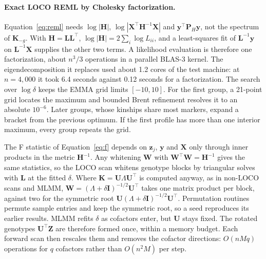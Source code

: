 \documentclass[11pt]{article}
\newcommand{\y}{\mathbf{y}}
\newcommand{\z}{\mathbf{z}}
\newcommand{\K}{\mathbf{K}}
\newcommand{\X}{\mathbf{X}}
\newcommand{\U}{\mathbf{U}}
\newcommand{\I}{\mathbf{I}}
\newcommand{\Hm}{\mathbf{H}}
\newcommand{\Pm}{\mathbf{P}}
\begin{document}
\paragraph{Exact LOCO REML by Cholesky factorization.}
Equation~\eqref{eq:reml} needs $\log|\Hm|$, $\log|\X^\top\Hm^{-1}\X|$
and $\y^\top\Pm_H\y$, not the spectrum of $\K_{-g}$. With
$\Hm=\mathbf L\mathbf L^\top$, $\log|\Hm|=2\sum_i\log L_{ii}$, and a
least-squares fit of $\mathbf L^{-1}\y$ on $\mathbf L^{-1}\X$ supplies
the other two terms. A likelihood evaluation is therefore one
factorization, about $n^3/3$ operations in a parallel BLAS-3 kernel.
The eigendecomposition it replaces used about 1.2 cores of the test
machine: at $n=4{,}000$ it took 6.4 seconds against 0.12 seconds for
a factorization. The search over $\log\delta$ keeps the EMMA grid
limits $[-10,10]$. For the first group, a 21-point grid locates the
maximum and bounded Brent refinement resolves it to an absolute
$10^{-6}$. Later groups, whose kinships share most markers, expand a
bracket from the previous optimum. If the first profile has more than
one interior maximum, every group repeats the grid.

The F statistic of Equation~\eqref{eq:f} depends on $\z_j$, $\y$ and
$\X$ only through inner products in the metric $\Hm^{-1}$. Any whitening
$\mathbf W$ with $\mathbf W^\top\mathbf W=\Hm^{-1}$ gives the same
statistics, so the LOCO scan whitens genotype blocks by triangular
solves with $\mathbf L$ at the fitted $\delta$. Where $\K=\U\Lambda\U^\top$
is computed anyway, as in non-LOCO scans and MLMM,
$\mathbf W=(\Lambda+\delta\I)^{-1/2}\U^\top$ takes one matrix product per
block, against two for the symmetric root
$\U(\Lambda+\delta\I)^{-1/2}\U^\top$. Permutation routines permute sample
entries and keep the symmetric root, so a seed reproduces its earlier
results. MLMM refits $\delta$ as cofactors enter, but $\U$ stays fixed.
The rotated genotypes $\U^\top\mathbf Z$ are therefore formed once,
within a memory budget. Each forward scan then rescales them and removes
the cofactor directions: $O(nMq)$ operations for $q$ cofactors rather
than $O(n^2M)$ per step.
\end{document}
